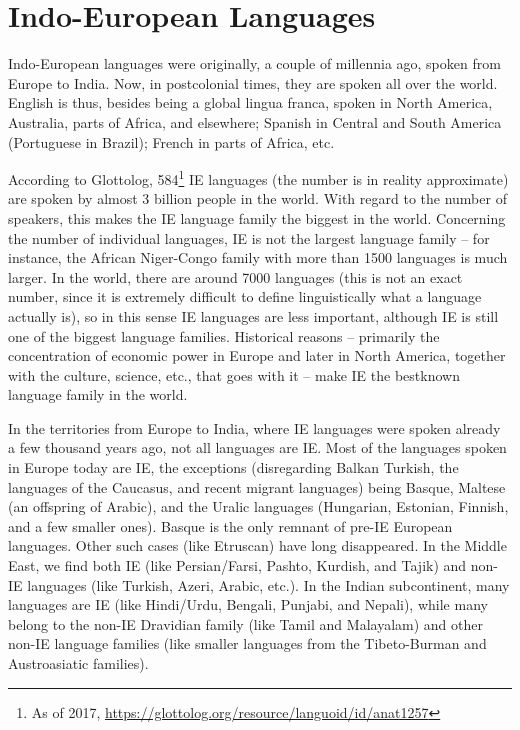 \chapter{Indo-European Languages}

Indo-European languages were originally, a couple of millennia ago, spoken from Europe
to India. Now, in postcolonial times, they are spoken all over the world. English is thus,
besides being a global lingua franca, spoken in North America, Australia, parts of Africa,
and elsewhere; Spanish in Central and South America (Portuguese in Brazil); French in
parts of Africa, etc. 

According to Glottolog, 584\footnote{As of 2017, \protect\url{https://glottolog.org/resource/languoid/id/anat1257}} IE languages (the number is in reality approximate) are spoken by almost 3 billion people in the world. With regard to the number
of speakers, this makes the IE language family the biggest in the world. Concerning
the number of individual languages, IE is not the largest language family – for instance,
the African Niger-Congo family with more than 1500 languages is much larger. In the
world, there are around 7000 languages (this is not an exact number, since it is extremely
difficult to define linguistically what a language actually is), so in this sense IE languages
are less important, although IE is still one of the biggest language families. Historical
reasons – primarily the concentration of economic power in Europe and later in North
America, together with the culture, science, etc., that goes with it – make IE the bestknown
language family in the world.

In the territories from Europe to India, where IE languages were spoken already a few
thousand years ago, not all languages are IE. Most of the languages spoken in Europe
today are IE, the exceptions (disregarding Balkan Turkish, the languages of the Caucasus,
and recent migrant languages) being Basque, Maltese (an offspring of Arabic), and
the Uralic languages (Hungarian, Estonian, Finnish, and a few smaller ones). Basque is
the only remnant of pre-IE European languages. Other such cases (like Etruscan) have
long disappeared. In the Middle East, we find both IE (like Persian/Farsi, Pashto, Kurdish,
and Tajik) and non-IE languages (like Turkish, Azeri, Arabic, etc.). In the Indian
subcontinent, many languages are IE (like Hindi/Urdu, Bengali, Punjabi, and Nepali),
while many belong to the non-IE Dravidian family (like Tamil and Malayalam) and other
non-IE language families (like smaller languages from the Tibeto-Burman and Austroasiatic families). 

